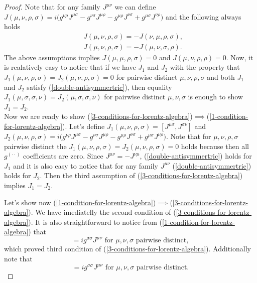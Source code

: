 \documentclass[main.tex]{subfiles}
\begin{document}
\begin{proof}

Note that for any family $J^{\mu\nu}$ we can define
$J(\mu, \nu, \rho, \sigma) = i\big( g^{\nu\rho } J^{\mu\sigma} 
- g^{\nu\sigma} J^{\mu\rho}
- g^{\mu\rho} J^{\nu\sigma}
+ g^{\mu\sigma} J^{\nu\rho}\big)$ and the following always holds
\begin{align}
\label{double-antisymmertric}
& J(\mu, \nu, \rho, \sigma) = - J(\nu, \mu, \rho, \sigma),\nonumber\\
& J(\mu, \nu, \rho, \sigma) = - J(\mu, \nu, \sigma, \rho).
\end{align}
The above assumptions implies $J(\mu, \mu, \rho, \sigma) = 0$ and $J(\mu, \nu, \rho, \rho) = 0$. Now, it is realatively easy to notice that if we have $J_1$ and $J_2$ with the property that $J_1(\mu, \nu, \rho, \sigma)=
J_2(\mu, \nu, \rho, \sigma)=0$ for pairwise distinct $\mu, \nu, \rho, \sigma$ and both $J_1$ and $J_2$ satisfy (\ref{double-antisymmertric}), then equality $J_1(\mu, \sigma, \sigma, \nu)=
J_2(\mu, \sigma, \sigma, \nu)$ for pairwise distinct $\mu,\nu,\sigma$ is enough to show $J_1 = J_2$.\\


Now we are ready to show (\ref{3-conditions-for-lorentz-algebra})$\implies$(\ref{1-condition-for-lorentz-algebra}). Let's define 
$J_1(\mu, \nu, \rho, \sigma) = [J^{\mu\sigma}, J^{\sigma\nu}]$ and $J_2(\mu, \nu, \rho, \sigma) = i\big( g^{\nu\rho } J^{\mu\sigma} 
- g^{\nu\sigma} J^{\mu\rho}
- g^{\mu\rho} J^{\nu\sigma}
+ g^{\mu\sigma} J^{\nu\rho}\big).$
Note that for $\mu, \nu, \rho, \sigma$ pairwise distinct the  $J_1(\mu, \nu, \rho, \sigma)=
J_2(\mu, \nu, \rho, \sigma)=0$ holds because then all $g^{(\cdot\cdot)}$ coefficients are zero.
Since $J^{\mu\nu} = -J^{\nu\mu}$, (\ref{double-antisymmertric}) holds for $J_1$ and it is also easy to notice that for any family $J^{\mu\nu}$ (\ref{double-antisymmertric}) holds for $J_2$. Then the third assumption of (\ref{3-conditions-for-lorentz-algebra}) implies $J_1 = J_2$.

Let's show now (\ref{1-condition-for-lorentz-algebra})$\implies$(\ref{3-conditions-for-lorentz-algebra}).
We have imediatelly the second condition of (\ref{3-conditions-for-lorentz-algebra}). It is also straightforward to notice from (\ref{1-condition-for-lorentz-algebra}) that
\begin{equation}
[J^{\mu\sigma}, J^{\sigma\nu}] = ig^{\sigma\sigma}J^{\mu\nu} \text{ for } \mu, \nu,  \sigma \text{ pairwise distinct},
\end{equation}
which proved third condition of (\ref{3-conditions-for-lorentz-algebra}). Additionally note that 
\begin{equation}
[J^{\sigma\mu}, J^{\nu\sigma}] = ig^{\sigma\sigma}J^{\mu\nu} \text{ for } \mu, \nu,  \sigma \text{ pairwise distinct}.
\end{equation} 


\end{proof}
\end{document}
